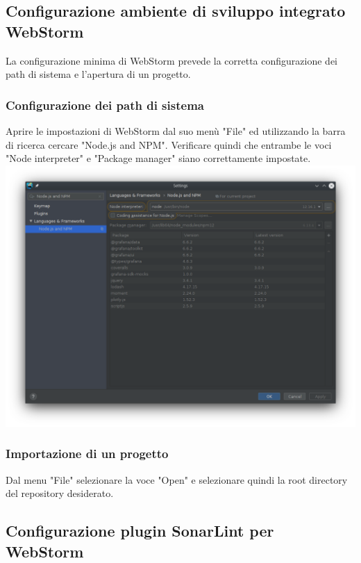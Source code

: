 \subsection{Configurazione ambiente di sviluppo integrato WebStorm}
La configurazione minima di WebStorm prevede la corretta configurazione dei path di sistema e l'apertura di un progetto.
\subsubsection{Configurazione dei path di sistema}
Aprire le impostazioni di WebStorm dal suo menù "File" ed utilizzando la barra di ricerca cercare "Node.js and NPM". Verificare quindi che entrambe le voci "Node interpreter" e "Package manager" siano correttamente impostate.
\\
\includegraphics[width=\textwidth,height=\textheight,keepaspectratio]{img/node-npm.png}
\subsubsection{Importazione di un progetto}
Dal menu "File" selezionare la voce "Open" e selezionare quindi la root directory del repository desiderato.
\subsection{Configurazione plugin SonarLint per WebStorm}
